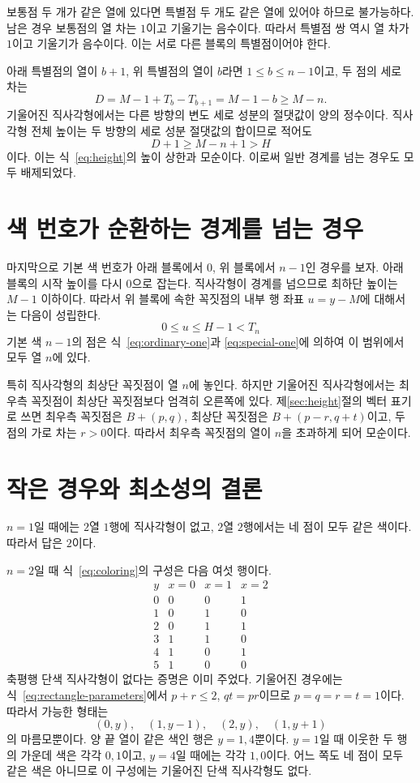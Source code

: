\documentclass[a4paper,11pt]{article}
\theoremstyle{definition}
\begin{document}
보통점 두 개가 같은 열에 있다면 특별점 두 개도 같은 열에 있어야
하므로 불가능하다. 남은 경우 보통점의 열 차는 $1$이고 기울기는
음수이다. 따라서 특별점 쌍 역시 열 차가 $1$이고 기울기가 음수이다.
이는 서로 다른 블록의 특별점이어야 한다.

아래 특별점의 열이 $b+1$, 위 특별점의 열이 $b$라면
$1\le b\le n-1$이고, 두 점의 세로 차는
\[
  D=M-1+T_b-T_{b+1}=M-1-b\ge M-n.
\]
기울어진 직사각형에서는 다른 방향의 변도 세로 성분의 절댓값이
양의 정수이다. 직사각형 전체 높이는 두 방향의 세로 성분 절댓값의
합이므로 적어도
\[
  D+1\ge M-n+1>H
\]
이다. 이는 식~\eqref{eq:height}의 높이 상한과 모순이다.
이로써 일반 경계를 넘는 경우도 모두 배제되었다.

\section{색 번호가 순환하는 경계를 넘는 경우}\label{sec:wrap}

마지막으로 기본 색 번호가 아래 블록에서 $0$, 위 블록에서 $n-1$인
경우를 보자. 아래 블록의 시작 높이를 다시 $0$으로 잡는다.
직사각형이 경계를 넘으므로 최하단 높이는 $M-1$ 이하이다.
따라서 위 블록에 속한 꼭짓점의 내부 행 좌표 $u=y-M$에 대해서는
다음이 성립한다.
\[
  0\le u\le H-1<T_n
\]
기본 색 $n-1$의 점은 식~\eqref{eq:ordinary-one}과
\eqref{eq:special-one}에 의하여 이 범위에서 모두 열 $n$에 있다.

특히 직사각형의 최상단 꼭짓점이 열 $n$에 놓인다.
하지만 기울어진 직사각형에서는 최우측 꼭짓점이 최상단 꼭짓점보다
엄격히 오른쪽에 있다. 제\ref{sec:height}절의 벡터 표기로 쓰면
최우측 꼭짓점은 $B+(p,q)$, 최상단 꼭짓점은 $B+(p-r,q+t)$이고,
두 점의 가로 차는 $r>0$이다.
따라서 최우측 꼭짓점의 열이 $n$을 초과하게 되어 모순이다.

\section{작은 경우와 최소성의 결론}\label{sec:small}

$n=1$일 때에는 $2$열 $1$행에 직사각형이 없고, $2$열 $2$행에서는
네 점이 모두 같은 색이다. 따라서 답은 $2$이다.

$n=2$일 때 식~\eqref{eq:coloring}의 구성은 다음 여섯 행이다.
\[
\begin{array}{c|ccc}
 y&x=0&x=1&x=2\\ \hline
 0&0&0&1\\
 1&0&1&0\\
 2&0&1&1\\
 3&1&1&0\\
 4&1&0&1\\
 5&1&0&0
\end{array}
\]
축평행 단색 직사각형이 없다는 증명은 이미 주었다.
기울어진 경우에는 식~\eqref{eq:rectangle-parameters}에서
$p+r\le2$, $qt=pr$이므로 $p=q=r=t=1$이다.
따라서 가능한 형태는
\[
  (0,y),\quad(1,y-1),\quad(2,y),\quad(1,y+1)
\]
의 마름모뿐이다. 양 끝 열이 같은 색인 행은 $y=1,4$뿐이다.
$y=1$일 때 이웃한 두 행의 가운데 색은 각각 $0,1$이고,
$y=4$일 때에는 각각 $1,0$이다. 어느 쪽도 네 점이 모두 같은 색은
아니므로 이 구성에는 기울어진 단색 직사각형도 없다.
\end{document}
